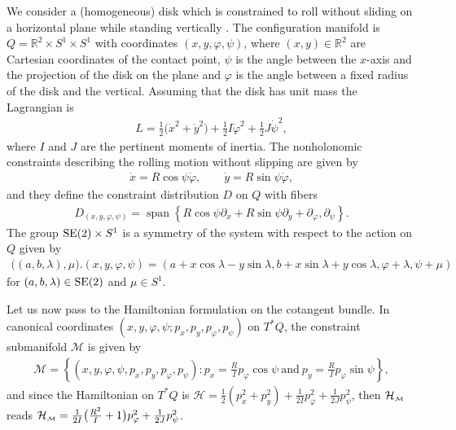 \documentclass[pdftex]{sigma}
\numberwithin{equation}{section}
\def\M{\mathcal{M}}
\def\Ham{\mathcal{H}}
\def\R{\mathbb{R}}
\def\subM{{\mbox{\tiny{$\M$}}}}
\begin{document}
We consider a (homogeneous) disk which is constrained to roll without sliding on a horizontal
plane while standing vertically \cite{BKMM, FSG2008, NF, Pars}.
The conf\/iguration manifold is $Q = \R^2\times S^1\times S^1$ with coordinates $(x,y,\varphi,\psi)$,
where $(x,y)\in \R^2$ are Cartesian coordinates of the contact point,
$\psi$ is the angle between the $x$-axis and the projection of the disk on the plane and $\varphi$
is the angle between a f\/ixed radius of the disk and the vertical. Assuming that the
disk has unit mass the Lagrangian is
\begin{gather*}
  L = \frac{1}{2} \big(\dot x^2+\dot y^2\big) +\frac{1}{2 } I \dot \varphi^2 + \frac{1}{2 } J \dot\psi^2,
\end{gather*}
where $I$ and $J$ are the pertinent moments of inertia.
The nonholonomic constraints describing the rolling motion without slipping are given by
\begin{gather*}
     \dot x = R \cos\psi  \dot\varphi, \qquad
     \dot y = R \sin\psi  \dot\varphi,
 \end{gather*}
and they def\/ine the constraint distribution $D$ on $Q$ with f\/ibers
\begin{gather*}
 D_{(x,y,\varphi, \psi)} = \operatorname{span} \left\{ R \cos\psi  \partial_x + R\sin\psi   \partial_y+ \partial_\varphi, \partial_\psi  \right\} .
\end{gather*}
The group ${\rm SE}(2)\times S^1$ is a symmetry of the system with respect to the action on $Q$ given by
\begin{gather*}
  \big((a,b,\lambda),\mu \big).(x,y,\varphi,\psi) = (a+x\cos \lambda- y\sin\lambda,
  b+ x\sin\lambda+y\cos\lambda,\varphi+\lambda,\psi+\mu)
\end{gather*}
for $(a,b,\lambda)\in {\rm SE}(2)$ and $\mu\in S^1$.

Let us now pass to the Hamiltonian formulation on the cotangent bundle. In  canonical coordinates $(x,y,\varphi, \psi ;p_x,p_y,p_\varphi,p_\psi)$ on $T^*Q$,
the constraint submanifold $\M$ is given by
\begin{gather*}
\M = \left\{(x,y,\varphi,\psi,p_x,p_y,p_\varphi,p_\psi)\colon
p_x = \frac{R}{I} p_\varphi \cos\psi \ \textrm{and} \ p_y = \frac{R}{I} p_\varphi \sin\psi \right\}   ,
\end{gather*}
and since  the Hamiltonian on $T^*Q$ is
$\Ham = \frac{1}{2} (p_x^2+p_y^2) +\frac{1}{2 I} p_\varphi^2 + \frac{1}{2 J} p^2_\psi$, then $\Ham_\subM$ reads
$\Ham_\subM = \frac{1}{2 I} \big( \frac{R^2}{I} +1\big) p_\varphi^2 + \frac{1}{2 J} p^2_\psi$.
\end{document}
